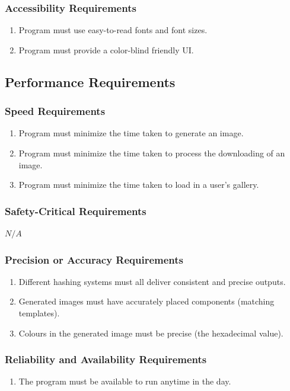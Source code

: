 \documentclass[12pt, titlepage]{article}
\begin{document}
\subsubsection{Accessibility Requirements}
\begin{enumerate}[label=UH\arabic*., resume=uhs]
    \item Program must use easy-to-read fonts and font sizes.
    \item Program must provide a color-blind friendly UI.
\end{enumerate}

\subsection{Performance Requirements}
\subsubsection{Speed Requirements}
\begin{enumerate}[label=PE\arabic*., series=pes]
    \item Program must minimize the time taken to generate an image.
    \item Program must minimize the time taken to process the downloading of an image.
    \item Program must minimize the time taken to load in a user's gallery.
\end{enumerate}

\subsubsection{Safety-Critical Requirements}
$N/A$
\subsubsection{Precision or Accuracy Requirements}
\begin{enumerate}[label=PE\arabic*., resume=pes]
    \item Different hashing systems must all deliver consistent and precise outputs.
    \item Generated images must have accurately placed components (matching templates).
    \item Colours in the generated image must be precise (the hexadecimal value).
\end{enumerate}

\subsubsection{Reliability and Availability Requirements}
\begin{enumerate}[label=PE\arabic*., resume=pes]
    \item The program must be available to run anytime in the day.
\end{enumerate}  
\end{document}
